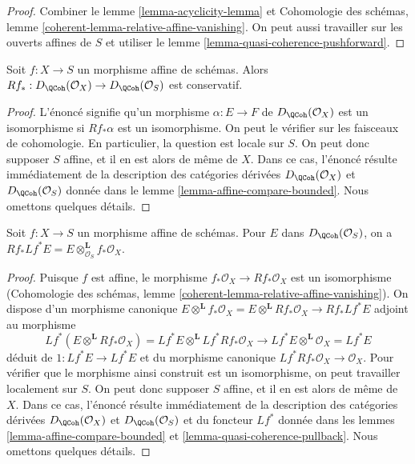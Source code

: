 \begin{proof}
Combiner le lemme \ref{lemma-acyclicity-lemma} et
Cohomologie des schémas, lemme \ref{coherent-lemma-relative-affine-vanishing}.
On peut aussi travailler sur les ouverts affines de $S$
et utiliser le lemme \ref{lemma-quasi-coherence-pushforward}.
\end{proof}

\begin{lemma}
\label{lemma-affine-morphism}
Soit $f : X \to S$ un morphisme affine de schémas.
Alors
$Rf_* : D_\QCoh(\mathcal{O}_X) \to D_\QCoh(\mathcal{O}_S)$
est conservatif.
\end{lemma}

\begin{proof}
L'énoncé signifie qu'un morphisme $\alpha : E \to F$ de
$D_\QCoh(\mathcal{O}_X)$ est un isomorphisme si
$Rf_*\alpha$ est un isomorphisme. On peut le vérifier sur les faisceaux de cohomologie.
En particulier, la question est locale sur $S$. On peut donc supposer $S$
affine, et il en est alors de même de $X$. Dans ce cas, l'énoncé résulte immédiatement de
la description des catégories dérivées
$D_\QCoh(\mathcal{O}_X)$ et
$D_\QCoh(\mathcal{O}_S)$ donnée dans
le lemme \ref{lemma-affine-compare-bounded}.
Nous omettons quelques détails.
\end{proof}

\begin{lemma}
\label{lemma-affine-morphism-pull-push}
Soit $f : X \to S$ un morphisme affine de schémas.
Pour $E$ dans $D_\QCoh(\mathcal{O}_S)$, on a
$Rf_* Lf^* E = E \otimes^\mathbf{L}_{\mathcal{O}_S} f_*\mathcal{O}_X$.
\end{lemma}

\begin{proof}
Puisque $f$ est affine, le morphisme $f_*\mathcal{O}_X \to Rf_*\mathcal{O}_X$
est un isomorphisme
(Cohomologie des schémas, lemme \ref{coherent-lemma-relative-affine-vanishing}).
On dispose d'un morphisme canonique $E \otimes^\mathbf{L} f_*\mathcal{O}_X =
E \otimes^\mathbf{L} Rf_*\mathcal{O}_X \to Rf_* Lf^* E$
adjoint au morphisme
$$
Lf^*(E \otimes^\mathbf{L} Rf_*\mathcal{O}_X) =
Lf^*E \otimes^\mathbf{L} Lf^*Rf_*\mathcal{O}_X \longrightarrow
Lf^* E \otimes^\mathbf{L} \mathcal{O}_X = Lf^* E
$$
déduit de $1 : Lf^*E \to Lf^*E$ et du morphisme canonique
$Lf^*Rf_*\mathcal{O}_X \to \mathcal{O}_X$. Pour vérifier que le morphisme ainsi construit
est un isomorphisme, on peut travailler localement sur $S$. On peut donc supposer
$S$ affine, et il en est alors de même de $X$. Dans ce cas, l'énoncé résulte immédiatement de
la description des catégories dérivées
$D_\QCoh(\mathcal{O}_X)$ et
$D_\QCoh(\mathcal{O}_S)$ et du foncteur $Lf^*$ donnée dans
les lemmes \ref{lemma-affine-compare-bounded} et
\ref{lemma-quasi-coherence-pullback}.
Nous omettons quelques détails.
\end{proof}

